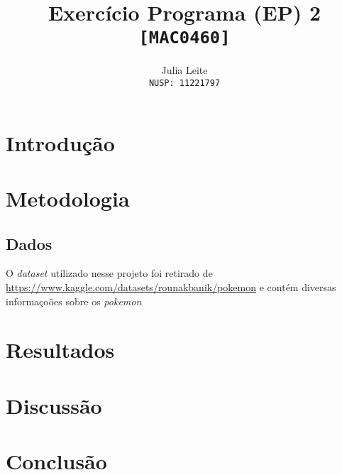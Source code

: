 \documentclass{article}
\title{Exercício Programa (EP) 2\\
    \large \texttt{[MAC0460]}}
\author{Julia Leite\\
    \large \texttt{NUSP: 11221797}}
\begin{document}
    
\maketitle

\tableofcontents

\section{Introdução}



\section{Metodologia}

\subsection{Dados}

O \textit{dataset} utilizado nesse projeto foi retirado de \url{https://www.kaggle.com/datasets/rounakbanik/pokemon} e contém diversas informaçoões sobre os \textit{pokemon} 

\section{Resultados}

\section{Discussão}

\section{Conclusão}
\end{document}
